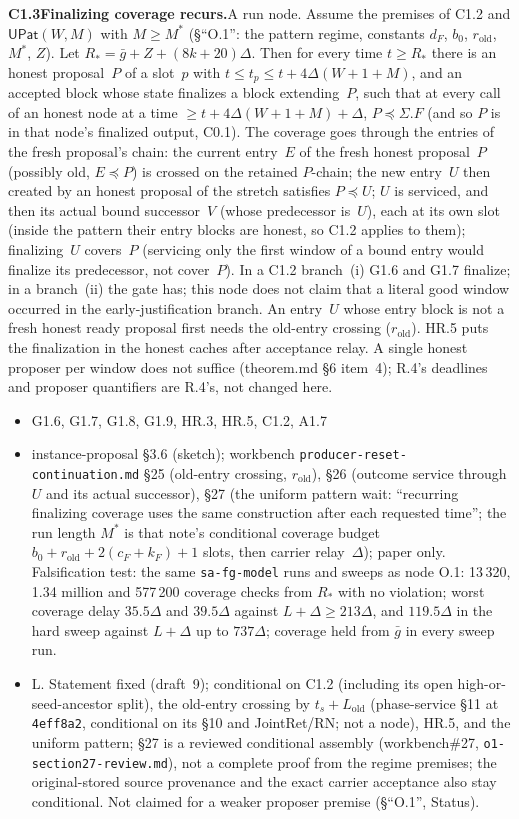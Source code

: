 \documentclass{article}
\newcommand{\cF}{c_F}
\newcommand{\dagnode}[6]{%
\par\medskip\noindent\textbf{#1\enspace #2.}\enspace #3
\begin{itemize}[leftmargin=2.2em,itemsep=0pt,topsep=2pt]
\item[\emph{Uses}] #4
\item[\emph{Evid.}] #5
\item[\emph{Task}] #6
\end{itemize}}
\begin{document}
\dagnode{C1.3}{Finalizing coverage recurs}{A run node.  Assume the premises of
C1.2 and $\mathsf{UPat}(W,M)$ with $M\geq M^*$ (\S``O.1'': the pattern regime,
constants $d_F$, $b_0$, $r_{\mathrm{old}}$, $M^*$, $Z$).  Let
$R_*=\bar g+Z+(8k+20)\Delta$.  Then for every time $t\geq R_*$ there is an
honest proposal~$P$ of a slot~$p$ with $t\leq t_p\leq t+4\Delta(W+1+M)$, and an
accepted block whose state finalizes a block extending~$P$, such that at every
call of an honest node at a time
$\geq t+4\Delta(W+1+M)+\Delta$, $P\preceq\Sigma.F$ (and so $P$ is in that
node's finalized output, C0.1).  The coverage goes through the entries of the
fresh proposal's chain: the current entry~$E$ of the fresh honest proposal~$P$
(possibly old, $E\preceq P$) is crossed on the retained $P$-chain; the new
entry~$U$ then created by an honest proposal of the stretch satisfies
$P\preceq U$; $U$ is serviced, and then its actual bound successor~$V$ (whose
predecessor is~$U$), each at its own slot (inside the pattern their entry blocks
are honest, so C1.2 applies to them); finalizing~$U$ covers~$P$ (servicing only
the first window of a bound entry would finalize its predecessor, not
cover~$P$).  In a C1.2
branch~(i) G1.6 and G1.7 finalize; in a branch~(ii) the gate has; this node
does not claim that a literal good window occurred in the early-justification
branch.  An entry~$U$ whose entry block is not a fresh honest ready proposal
first needs the old-entry crossing ($r_{\mathrm{old}}$).  HR.5 puts the
finalization in the honest caches after acceptance relay.  A single honest
proposer per window does not suffice (theorem.md \S6 item~4); R.4's deadlines
and proposer quantifiers are R.4's, not changed here.}
{G1.6, G1.7, G1.8, G1.9, HR.3, HR.5, C1.2, A1.7}{instance-proposal \S3.6 (sketch);
workbench \texttt{producer-reset-continuation.md} \S25 (old-entry crossing,
$r_{\mathrm{old}}$), \S26 (outcome service through $U$ and its actual
successor), \S27 (the uniform pattern wait: ``recurring finalizing coverage uses
the same construction after each requested time''; the run length $M^*$ is that
note's conditional coverage budget $b_0+r_{\mathrm{old}}+2(\cF+k_F)+1$ slots,
then carrier relay~$\Delta$); paper only.  Falsification test: the same
\texttt{sa-fg-model} runs and sweeps as node O.1: 13\,320, 1.34 million and
577\,200 coverage checks from $R_*$ with no violation; worst coverage delay
$35.5\Delta$ and $39.5\Delta$ against $L+\Delta\geq213\Delta$, and $119.5\Delta$
in the hard sweep against $L+\Delta$ up to $737\Delta$; coverage held from
$\bar g$ in every sweep run.}{L.  Statement fixed (draft~9);
conditional on C1.2 (including its open high-or-seed-ancestor split), the
old-entry crossing by $t_s+L_{\mathrm{old}}$ (phase-service \S11 at
\texttt{4eff8a2}, conditional on its \S10 and JointRet/RN; not a node), HR.5,
and the uniform pattern; \S27 is a reviewed conditional assembly
(workbench\#27, \texttt{o1-section27-review.md}), not a complete proof from the
regime premises; the original-stored source provenance and the exact carrier
acceptance also stay conditional.  Not claimed for a weaker proposer
premise (\S``O.1'', Status).}
\end{document}
